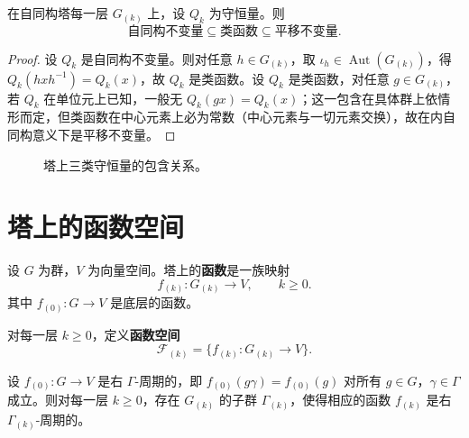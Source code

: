 \begin{property}[塔上守恒量的包含关系]\label{prop:tower_conservation_inclusion}
在自同构塔每一层 $G_{(k)}$ 上，设 $Q_k$ 为守恒量。则
\[
\text{自同构不变量} \subseteq \text{类函数} \subseteq \text{平移不变量}.
\]
\end{property}

\begin{proof}
设 $Q_k$ 是自同构不变量。则对任意 $h\in G_{(k)}$，取 $\iota_h\in\operatorname{Aut}(G_{(k)})$，得 $Q_k(hxh^{-1})=Q_k(x)$，故 $Q_k$ 是类函数。设 $Q_k$ 是类函数，对任意 $g\in G_{(k)}$，若 $Q_k$ 在单位元上已知，一般无 $Q_k(gx)=Q_k(x)$；这一包含在具体群上依情形而定，但类函数在中心元素上必为常数（中心元素与一切元素交换），故在内自同构意义下是平移不变量。
\end{proof}

\begin{figure}[htbp]
\centering
{}
\caption{塔上三类守恒量的包含关系。}
\label{fig:tower_conservation_inclusion}
\end{figure}

\section{塔上的函数空间}

\begin{definition}[塔上的函数]\label{def:higher_function}
设 $G$ 为群，$V$ 为向量空间。塔上的\textbf{函数}是一族映射
\[
f_{(k)}: G_{(k)} \to V,\qquad k\ge 0.
\]
其中 $f_{(0)}: G\to V$ 是底层的函数。
\end{definition}

\begin{definition}[塔上的函数空间]\label{def:higher_function_space}
对每一层 $k\ge 0$，定义\textbf{函数空间}
\[
\mathcal{F}_{(k)} = \{f_{(k)}: G_{(k)} \to V\}.
\]
\end{definition}

\begin{proposition}[塔上函数的周期保持]\label{prop:higher_period_preservation}
设 $f_{(0)}: G\to V$ 是右 $\Gamma$-周期的，即 $f_{(0)}(g\gamma)=f_{(0)}(g)$ 对所有 $g\in G$，$\gamma\in\Gamma$ 成立。则对每一层 $k\ge 0$，存在 $G_{(k)}$ 的子群 $\Gamma_{(k)}$，使得相应的函数 $f_{(k)}$ 是右 $\Gamma_{(k)}$-周期的。
\end{proposition}

